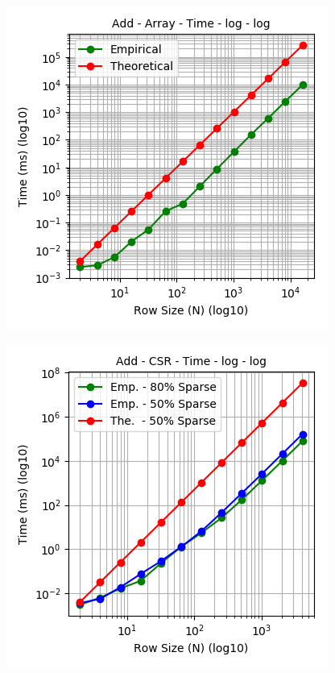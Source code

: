 \documentclass[11pt,a4paper,oneside]{article}
\begin{document}
    \begin{center}
    	\includegraphics[scale=0.6]{3.png}		
    \end{center}
    
    \begin{center}
    	\includegraphics[scale=0.6]{4.png}		
    \end{center}
    
\end{document}
